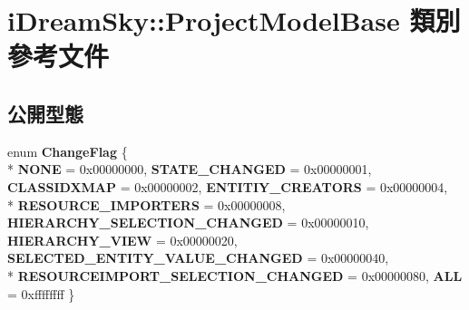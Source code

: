 \hypertarget{classi_dream_sky_1_1_project_model_base}{}\section{i\+Dream\+Sky\+:\+:Project\+Model\+Base 類別 參考文件}
\label{classi_dream_sky_1_1_project_model_base}
\subsection*{公開型態}
\begin{DoxyCompactItemize}
\item 
enum {\bfseries Change\+Flag} \{ \\*
{\bfseries N\+O\+NE} = 0x00000000, 
{\bfseries S\+T\+A\+T\+E\+\_\+\+C\+H\+A\+N\+G\+ED} = 0x00000001, 
{\bfseries C\+L\+A\+S\+S\+I\+D\+X\+M\+AP} = 0x00000002, 
{\bfseries E\+N\+T\+I\+T\+I\+Y\+\_\+\+C\+R\+E\+A\+T\+O\+RS} = 0x00000004, 
\\*
{\bfseries R\+E\+S\+O\+U\+R\+C\+E\+\_\+\+I\+M\+P\+O\+R\+T\+E\+RS} = 0x00000008, 
{\bfseries H\+I\+E\+R\+A\+R\+C\+H\+Y\+\_\+\+S\+E\+L\+E\+C\+T\+I\+O\+N\+\_\+\+C\+H\+A\+N\+G\+ED} = 0x00000010, 
{\bfseries H\+I\+E\+R\+A\+R\+C\+H\+Y\+\_\+\+V\+I\+EW} = 0x00000020, 
{\bfseries S\+E\+L\+E\+C\+T\+E\+D\+\_\+\+E\+N\+T\+I\+T\+Y\+\_\+\+V\+A\+L\+U\+E\+\_\+\+C\+H\+A\+N\+G\+ED} = 0x00000040, 
\\*
{\bfseries R\+E\+S\+O\+U\+R\+C\+E\+I\+M\+P\+O\+R\+T\+\_\+\+S\+E\+L\+E\+C\+T\+I\+O\+N\+\_\+\+C\+H\+A\+N\+G\+ED} = 0x00000080, 
{\bfseries A\+LL} = 0xffffffff
 \}\hypertarget{classi_dream_sky_1_1_project_model_base_aaeeb6cd7cb360baaa87d450f8b63452b}{}\label{classi_dream_sky_1_1_project_model_base_aaeeb6cd7cb360baaa87d450f8b63452b}

\end{DoxyCompactItemize}
